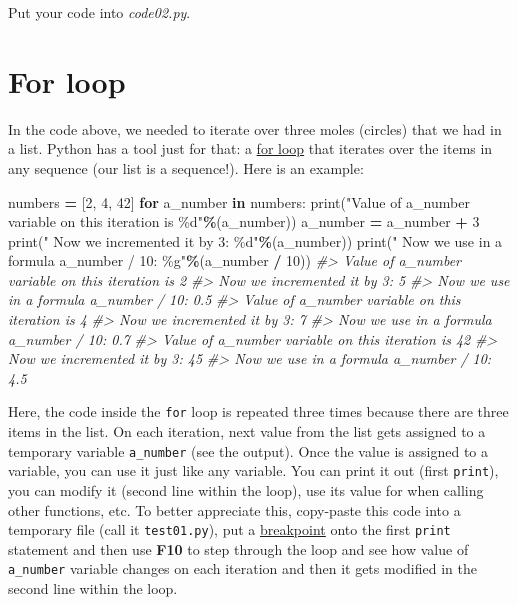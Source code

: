 \documentclass[
]{book}
\newenvironment{Shaded}{\begin{snugshade}}{\end{snugshade}}
\newcommand{\BuiltInTok}[1]{#1}
\newcommand{\CommentTok}[1]{\textcolor[rgb]{0.56,0.35,0.01}{\textit{#1}}}
\newcommand{\ControlFlowTok}[1]{\textcolor[rgb]{0.13,0.29,0.53}{\textbf{#1}}}
\newcommand{\DecValTok}[1]{\textcolor[rgb]{0.00,0.00,0.81}{#1}}
\newcommand{\KeywordTok}[1]{\textcolor[rgb]{0.13,0.29,0.53}{\textbf{#1}}}
\newcommand{\NormalTok}[1]{#1}
\newcommand{\OperatorTok}[1]{\textcolor[rgb]{0.81,0.36,0.00}{\textbf{#1}}}
\newcommand{\SpecialCharTok}[1]{\textcolor[rgb]{0.00,0.00,0.00}{#1}}
\newcommand{\StringTok}[1]{\textcolor[rgb]{0.31,0.60,0.02}{#1}}
\begin{document}
Put your code into \emph{code02.py}.

\hypertarget{for-loop}{%
\section{For loop}\label{for-loop}}

In the code above, we needed to iterate over three moles (circles) that we had in a list. Python has a tool just for that: a
\href{https://docs.python.org/3/tutorial/controlflow.html?highlight=loop\#for-statements}{for loop} that iterates over the items in any sequence (our list is a sequence!). Here is an example:

\begin{Shaded}
\begin{Highlighting}[]
\NormalTok{numbers }\OperatorTok{=}\NormalTok{ [}\DecValTok{2}\NormalTok{, }\DecValTok{4}\NormalTok{, }\DecValTok{42}\NormalTok{]}
\ControlFlowTok{for}\NormalTok{ a\_number }\KeywordTok{in}\NormalTok{ numbers:}
    \BuiltInTok{print}\NormalTok{(}\StringTok{"Value of a\_number variable on this iteration is }\SpecialCharTok{\%d}\StringTok{"}\OperatorTok{\%}\NormalTok{(a\_number))}
\NormalTok{    a\_number }\OperatorTok{=}\NormalTok{ a\_number }\OperatorTok{+} \DecValTok{3}
    \BuiltInTok{print}\NormalTok{(}\StringTok{"  Now we incremented it by 3: }\SpecialCharTok{\%d}\StringTok{"}\OperatorTok{\%}\NormalTok{(a\_number))}
    \BuiltInTok{print}\NormalTok{(}\StringTok{"  Now we use in a formula a\_number / 10: }\SpecialCharTok{\%g}\StringTok{"}\OperatorTok{\%}\NormalTok{(a\_number }\OperatorTok{/} \DecValTok{10}\NormalTok{))}
\CommentTok{\#\textgreater{} Value of a\_number variable on this iteration is 2}
\CommentTok{\#\textgreater{}   Now we incremented it by 3: 5}
\CommentTok{\#\textgreater{}   Now we use in a formula a\_number / 10: 0.5}
\CommentTok{\#\textgreater{} Value of a\_number variable on this iteration is 4}
\CommentTok{\#\textgreater{}   Now we incremented it by 3: 7}
\CommentTok{\#\textgreater{}   Now we use in a formula a\_number / 10: 0.7}
\CommentTok{\#\textgreater{} Value of a\_number variable on this iteration is 42}
\CommentTok{\#\textgreater{}   Now we incremented it by 3: 45}
\CommentTok{\#\textgreater{}   Now we use in a formula a\_number / 10: 4.5}
\end{Highlighting}
\end{Shaded}

Here, the code inside the \texttt{for} loop is repeated three times because there are three items in the list. On each iteration, next value from the list gets assigned to a temporary variable \texttt{a\_number} (see the output). Once the value is assigned to a variable, you can use it just like any variable. You can print it out (first \texttt{print}), you can modify it (second line within the loop), use its value for when calling other functions, etc. To better appreciate this, copy-paste this code into a temporary file (call it \texttt{test01.py}), put a \protect\hyperlink{debugging}{breakpoint} onto the first \texttt{print} statement and then use \textbf{F10} to step through the loop and see how value of \texttt{a\_number} variable changes on each iteration and then it gets modified in the second line within the loop.
\end{document}
